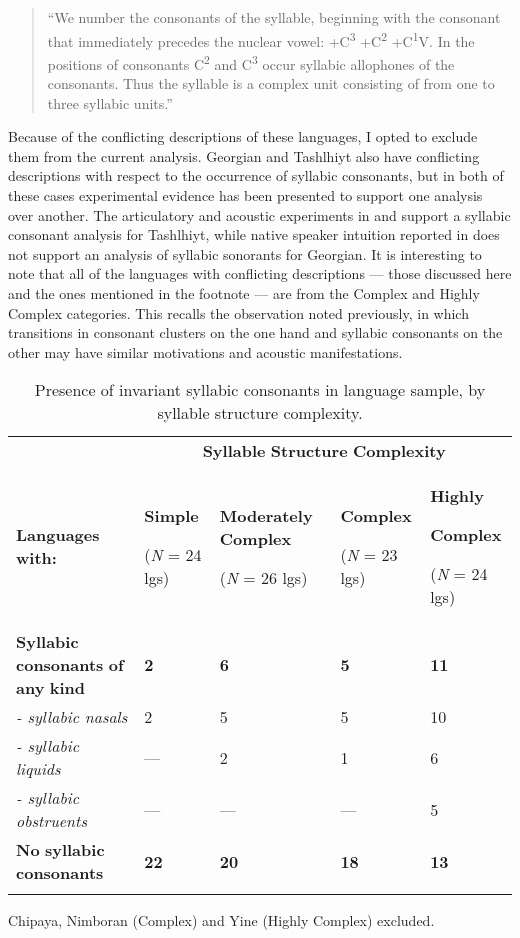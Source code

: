 \begin{quote}
“We number the consonants of the syllable, beginning with the consonant that immediately precedes the nuclear vowel: +C\textsuperscript{3} +C\textsuperscript{2} +C\textsuperscript{1}V. In the positions of consonants C\textsuperscript{2} and C\textsuperscript{3} occur syllabic allophones of the consonants. Thus the syllable is a complex unit consisting of from one to three syllabic units.” 

\citep[23]{Matteson1965}
\end{quote}

Because of the conflicting descriptions of these languages, I opted to exclude them from the current analysis. Georgian and Tashlhiyt also have conflicting descriptions with respect to the occurrence of syllabic consonants, but in both of these cases experimental evidence has been presented to support one analysis over another. The articulatory and acoustic experiments in \citet{Ridouane2008} and \citet{GoldsteinEtAl2007} support a syllabic consonant analysis for Tashlhiyt, while native speaker intuition reported in \citet{Chitoran1999} does not support an analysis of syllabic sonorants for Georgian. It is interesting to note that all of the languages with conflicting descriptions — those discussed here and the ones mentioned in the footnote — are from the Complex and Highly Complex categories. This recalls the observation noted previously, in which transitions in consonant clusters on the one hand and syllabic consonants on the other may have similar motivations and acoustic manifestations.

\begin{table}
\begin{tabularx}{\textwidth}{XXXXX}
 & \multicolumn{4}{c}{ \textbf{Syllable} \textbf{Structure} \textbf{Complexity}}\\
\lsptoprule
 \textbf{Languages} \textbf{with:} & { \textbf{Simple}}

 (\textit{N} = 24 lgs) & { \textbf{Moderately} \textbf{Complex}}

 (\textit{N} = 26 lgs) & { \textbf{Complex}}

 (\textit{N} = 23 lgs) & { \textbf{Highly} }

{ \textbf{Complex}}

 (\textit{N} = 24 lgs)\\
 \textbf{Syllabic} \textbf{consonants} \textbf{of} \textbf{any} \textbf{kind} & \textbf{2} & \textbf{6} & \textbf{5} & \textbf{11}\\
 \textit{{}- syllabic nasals} & 2 & 5 & 5 & 10\\
 \textit{{}- syllabic liquids} & — & 2 & 1 & 6\\
 \textit{{}- syllabic obstruents} & — & — & — & 5\\
 \textbf{No} \textbf{syllabic} \textbf{consonants} & \textbf{22} & \textbf{20} & \textbf{18} & \textbf{13}\\
\lspbottomrule
\end{tabularx}
\caption{\label{3.6}Presence of invariant syllabic consonants in language sample, by syllable structure complexity.}Chipaya, Nimboran (Complex) and Yine (Highly Complex) excluded.
\end{table}

